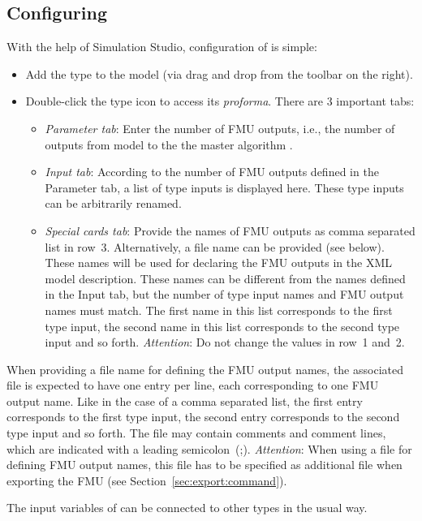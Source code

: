 \subsection{Configuring \typeb}
With the help of Simulation Studio, configuration of \typeb is simple:
\begin{itemize}
  \item Add the type to the model (via drag and drop from the toolbar on the right).
  \item Double-click the type icon to access its \emph{proforma}. There are 3 important tabs:
  \begin{itemize}
    \item \emph{Parameter tab}: Enter the number of FMU outputs, i.e., the number of outputs from \trnsys model to the the master algorithm .
    \item \emph{Input tab}: According to the number of FMU outputs defined in the Parameter tab, a list of type inputs is displayed here.
    These type inputs can be arbitrarily renamed.
    \item \emph{Special cards tab}: Provide the names of FMU outputs as comma separated list in row~3.
    Alternatively, a file name can be provided (see below).
    These names will be used for declaring the FMU outputs in the XML model description.
    These names can be different from the names defined in the Input tab, but the number of type input names and FMU output names must match.
    The first name in this list corresponds to the first type input, the second name in this list corresponds to the second type input and so forth.
    \emph{Attention}: Do not change the values in row~1 and~2.
  \end{itemize}
\end{itemize} 

When providing a file name for defining the FMU output names, the associated file is expected to have one entry per line, each corresponding to one FMU output name.
Like in the case of a comma separated list, the first entry corresponds to the first type input, the second entry corresponds to the second type input and so forth.
The file may contain comments and comment lines, which are indicated with a leading semicolon~(;).
\emph{Attention}: When using a file for defining FMU output names, this file has to be specified as additional file when exporting the FMU (see Section~\ref{sec:export:command}).

The input variables of \typeb can be connected to other \trnsys types in the usual way.

